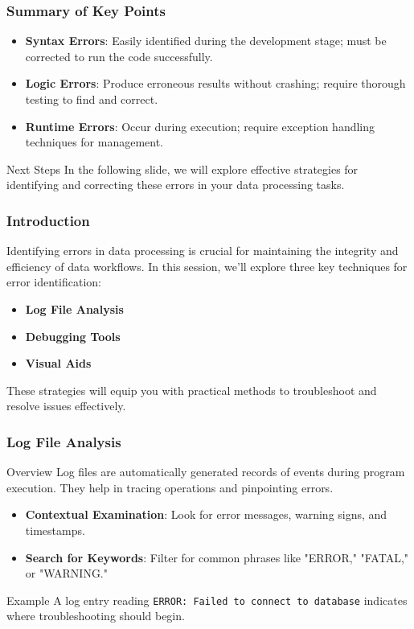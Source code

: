 \documentclass[aspectratio=169]{beamer}
\begin{document}
\begin{frame}
    \frametitle{Summary of Key Points}
    \begin{itemize}
        \item \textbf{Syntax Errors}: Easily identified during the development stage; must be corrected to run the code successfully.
        \item \textbf{Logic Errors}: Produce erroneous results without crashing; require thorough testing to find and correct.
        \item \textbf{Runtime Errors}: Occur during execution; require exception handling techniques for management.
    \end{itemize}
    \begin{block}{Next Steps}
        In the following slide, we will explore effective strategies for identifying and correcting these errors in your data processing tasks.
    \end{block}
\end{frame}

\begin{frame}
    \frametitle{Introduction}
    Identifying errors in data processing is crucial for maintaining the integrity and efficiency of data workflows. In this session, we’ll explore three key techniques for error identification:
    \begin{itemize}
        \item \textbf{Log File Analysis}
        \item \textbf{Debugging Tools}
        \item \textbf{Visual Aids}
    \end{itemize}
    These strategies will equip you with practical methods to troubleshoot and resolve issues effectively.
\end{frame}

\begin{frame}
    \frametitle{Log File Analysis}
    \begin{block}{Overview}
        Log files are automatically generated records of events during program execution. They help in tracing operations and pinpointing errors.
    \end{block}

    \begin{itemize}
        \item \textbf{Contextual Examination}: Look for error messages, warning signs, and timestamps.
        \item \textbf{Search for Keywords}: Filter for common phrases like "ERROR," "FATAL," or "WARNING."
    \end{itemize}

    \begin{block}{Example}
        A log entry reading \texttt{ERROR: Failed to connect to database} indicates where troubleshooting should begin.
    \end{block}
\end{frame}
\end{document}
